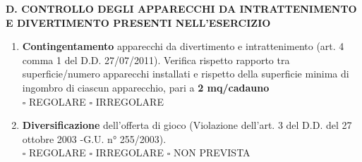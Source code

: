 \documentclass[12pt]{article}
\begin{document}
\newpage


\begin{center}
    \textbf{D. CONTROLLO DEGLI APPARECCHI DA INTRATTENIMENTO E DIVERTIMENTO PRESENTI NELL’ESERCIZIO}
\end{center}
\begin{enumerate}[resume]
    \item \textbf{Contingentamento} apparecchi da divertimento e intrattenimento (art. 4 comma 1 del D.D. 27/07/2011). Verifica rispetto rapporto tra superficie/numero apparecchi installati e rispetto della superficie minima di ingombro di ciascun apparecchio, pari a \textbf{2 mq/cadauno }
    \\\begin{math} \square\end{math} REGOLARE \begin{math}\square\end{math} IRREGOLARE
    \item \textbf{Diversificazione} dell’offerta di gioco (Violazione dell’art. 3 del D.D. del 27 ottobre 2003 -G.U. n° 255/2003).
    \\\begin{math} \square\end{math} REGOLARE \begin{math}\square\end{math} IRREGOLARE \begin{math}\square\end{math} NON PREVISTA
\end{enumerate}
\end{document}
